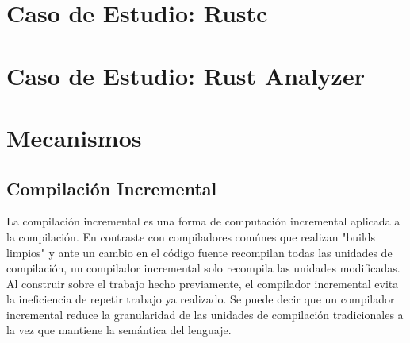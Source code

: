 \documentclass[12pt, a4paper]{report}
\begin{document}

\chapter*{Caso de Estudio: Rustc}

\chapter*{Caso de Estudio: Rust Analyzer}

\chapter*{Mecanismos}

  \section*{Compilación Incremental}

    La compilación incremental es una forma de computación incremental aplicada a la compilación.
    En contraste con compiladores comúnes que realizan "builds limpios" y ante un cambio en el código fuente recompilan todas las unidades de compilación, un compilador incremental solo recompila las unidades modificadas.
    Al construir sobre el trabajo hecho previamente, el compilador incremental evita la ineficiencia de repetir trabajo ya realizado.
    Se puede decir que un compilador incremental reduce la granularidad de las unidades de compilación tradicionales a la vez que mantiene la semántica del lenguaje.
    \cite{wiki_incremental_compiler}
\end{document}
